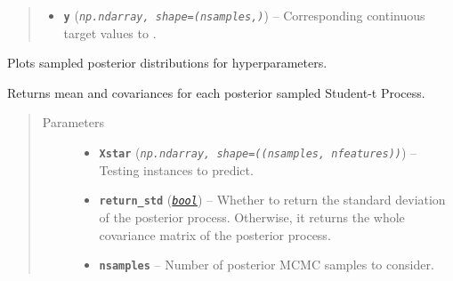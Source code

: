 \documentclass[letterpaper,10pt,english]{sphinxmanual}
\begin{document}
\begin{fulllineitems}
\begin{fulllineitems}
\begin{quote}
\begin{description}
\begin{itemize}
\item {} 
\textbf{\texttt{y}} (\emph{\texttt{np.ndarray, shape=(nsamples,)}}) -- Corresponding continuous target values to .

\end{itemize}

\end{description}\end{quote}

\end{fulllineitems}


\begin{fulllineitems}
\label{pyGPGO.surrogates.tStudentProcessMCMC:pyGPGO.surrogates.tStudentProcessMCMC.tStudentProcessMCMC.posteriorPlot}
Plots sampled posterior distributions for hyperparameters.

\end{fulllineitems}


\begin{fulllineitems}
\label{pyGPGO.surrogates.tStudentProcessMCMC:pyGPGO.surrogates.tStudentProcessMCMC.tStudentProcessMCMC.predict}
Returns mean and covariances for each posterior sampled Student-t Process.
\begin{quote}\begin{description}
\item[{Parameters}] \leavevmode\begin{itemize}
\item {} 
\textbf{\texttt{Xstar}} (\emph{\texttt{np.ndarray, shape=((nsamples, nfeatures))}}) -- Testing instances to predict.

\item {} 
\textbf{\texttt{return\_std}} (\href{https://docs.python.org/2/library/functions.html\#bool}{\emph{\texttt{bool}}}) -- Whether to return the standard deviation of the posterior process. Otherwise,
it returns the whole covariance matrix of the posterior process.

\item {} 
\textbf{\texttt{nsamples}} -- Number of posterior MCMC samples to consider.


\end{itemize}
\end{description}
\end{quote}
\end{fulllineitems}
\end{fulllineitems}
\end{document}
